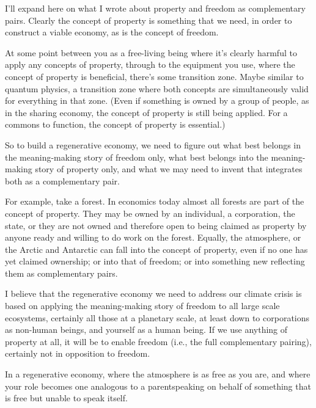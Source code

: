 I'll expand here on what I wrote about property and freedom  as complementary pairs. Clearly the concept of property is something that we need, in order to construct a viable economy, as is the concept of freedom. 


At some point between you as a free-living being where it's clearly harmful to apply any concepts of property, through to the equipment you use, where the concept of property is beneficial, there's some transition zone. Maybe similar to quantum physics, a transition zone where both concepts are simultaneously valid for everything in that zone. (Even if something is owned by a group of people, as in the sharing economy, the concept of property is still being applied. For a commons to function, the concept of property is essential.)


So to build a regenerative economy, we need to figure out what best belongs in the meaning\hyp{}making story of freedom only, what best belongs into the meaning\hyp{}making story of property only, and what we may need to invent that integrates both as a complementary pair.


For example, take a forest. In economics  today almost all forests are part of the concept of property. They may be owned by an individual, a corporation, the state, or they are not owned and therefore open to being claimed as property by anyone ready and willing to do work on the forest. Equally, the atmosphere, or the Arctic and Antarctic can fall into the concept of property, even if no one has yet claimed ownership; or into that of freedom; or into something new reflecting them as complementary pairs.


I believe that the regenerative economy we need to address our climate crisis is based on applying the meaning\hyp{}making story of freedom to all large scale ecosystems, certainly all those at a planetary scale, at least down to corporations as non-human beings, and yourself as a human being. If we use anything of property at all, it will be to enable freedom (i.e., the full complementary pairing), certainly not in opposition to freedom. 


In a regenerative economy, where the atmosphere is as free as you are, and where your role becomes one analogous to a parent\textemdash speaking on behalf of something that is free but unable to speak itself.


